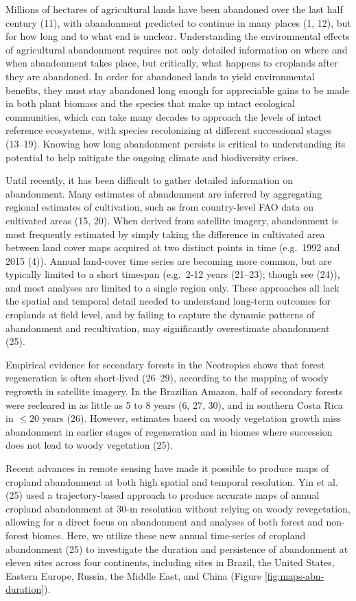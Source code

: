 \documentclass[9pt,twocolumn,twoside,lineno]{pnas-new}
\begin{document}
Millions of hectares of agricultural lands have been abandoned over the last half century (11), with abandonment predicted to continue in many places (1, 12), but for how long and to what end is unclear.
Understanding the environmental effects of agricultural abandonment requires not only detailed information on where and when abandonment takes place, but critically, what happens to croplands after they are abandoned.
In order for abandoned lands to yield environmental benefits, they must stay abandoned long enough for appreciable gains to be made in both plant biomass and the species that make up intact ecological communities, which can take many decades to approach the levels of intact reference ecosystems, with species recolonizing at different successional stages (13--19).
Knowing how long abandonment persists is critical to understanding its potential to help mitigate the ongoing climate and biodiversity crises.

Until recently, it has been difficult to gather detailed information on abandonment.
Many estimates of abandonment are inferred by aggregating regional estimates of cultivation, such as from country-level FAO data on cultivated areas (15, 20).
When derived from satellite imagery, abandonment is most frequently estimated by simply taking the difference in cultivated area between land cover maps acquired at two distinct points in time (e.g.~1992 and 2015 (4)).
Annual land-cover time series are becoming more common, but are typically limited to a short timespan (e.g.~2-12 years (21--23); though see (24)), and most analyses are limited to a single region only.
These approaches all lack the spatial and temporal detail needed to understand long-term outcomes for croplands at field level, and by failing to capture the dynamic patterns of abandonment and recultivation, may significantly overestimate abandonment (25).

Empirical evidence for secondary forests in the Neotropics shows that forest regeneration is often short-lived (26--29), according to the mapping of woody regrowth in satellite imagery.
In the Brazilian Amazon, half of secondary forests were recleared in as little as 5 to 8 years (6, 27, 30), and in southern Costa Rica in \(\leq20\) years (26).
However, estimates based on woody vegetation growth miss abandonment in earlier stages of regeneration and in biomes where succession does not lead to woody vegetation (25).

Recent advances in remote sensing have made it possible to produce maps of cropland abandonment at both high spatial and temporal resolution.
Yin et al. (25) used a trajectory-based approach to produce accurate maps of annual cropland abandonment at 30-m resolution without relying on woody revegetation, allowing for a direct focus on abandonment and analyses of both forest and non-forest biomes.
Here, we utilize these new annual time-series of cropland abandonment (25) to investigate the duration and persistence of abandonment at eleven sites across four continents, including sites in Brazil, the United States, Eastern Europe, Russia, the Middle East, and China (Figure \ref{fig:maps-abn-duration}).
\end{document}
